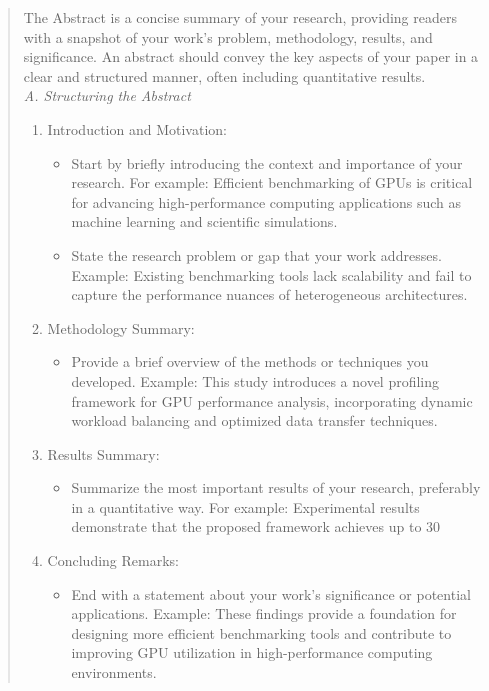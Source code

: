 \documentclass[conference]{IEEEtran}
\begin{document}
\begin{abstract}
  The Abstract is a concise summary of your research, providing readers with a snapshot of your work's problem, methodology, results, and significance. An abstract should convey the key aspects of your paper in a clear and structured manner, often including quantitative results.\\[0.5em]
\emph{A. Structuring the Abstract}
\begin{enumerate}
\item Introduction and Motivation:
\begin{itemize}
\item Start by briefly introducing the context and importance of your research. For example: Efficient benchmarking of GPUs is critical for advancing high-performance computing applications such as machine learning and scientific simulations.
\item State the research problem or gap that your work addresses. Example: Existing benchmarking tools lack scalability and fail to capture the performance nuances of heterogeneous architectures.
\end{itemize}
\item Methodology Summary:
\begin{itemize}
\item Provide a brief overview of the methods or techniques you developed. Example: This study introduces a novel profiling framework for GPU performance analysis, incorporating dynamic workload balancing and optimized data transfer techniques.
\end{itemize}
\item Results Summary:
\begin{itemize}
\item Summarize the most important results of your research, preferably in a quantitative way. For example: Experimental results demonstrate that the proposed framework achieves up to 30%
\end{itemize}
\item Concluding Remarks:
\begin{itemize}
\item End with a statement about your work's significance or potential applications. Example: These findings provide a foundation for designing more efficient benchmarking tools and contribute to improving GPU utilization in high-performance computing environments.
\end{itemize}

\end{enumerate}
\end{abstract}
\end{document}
